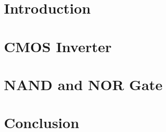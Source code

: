 \documentclass{article}
\begin{document}
\begin{titlepage}

\end{titlepage}
\section{Introduction}

\section{CMOS Inverter}

\section{NAND and NOR Gate}

\section{Conclusion}

\end{document}
